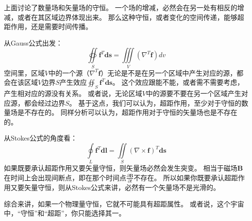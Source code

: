 上面讨论了数量场和矢量场的守恒。
一个场的增减，必然会在另一处有相反的增减，或者在其区域边界体现出来。
那么这种守恒，或者变化的空间传递，能够超距作用，还是需要时间传播。

从Gauss公式出发：
\[
\oiint\limits_S{\boldsymbol{f}^T\boldsymbol{ds}}=\iiint\limits_V{\left( \nabla ^T\boldsymbol{f} \right) dv}
\]
空间里，区域$V$中的一个源（$\nabla ^T\boldsymbol{f}$）无论是不是在另一个区域中产生对应的源，都会在该区域$V$边界$S$产生效应$\oiint_S{\boldsymbol{f}^T\boldsymbol{ds}}$。
这个效应跟能不能，或者需不需要考虑，产生相对应的源没有关系。
或者说，无论区域$V$中的源要不要在另一个区域产生对应源，都会经过边界$S$。
基于这点，我们可以认为，超距作用，至少对于守恒的数量场是不存在的。
同样分析可以认为，超距作用对于守恒的矢量场也是不存在的。

从Stokes公式的角度看：
\[
\oint\limits_L{\boldsymbol{f}^T\boldsymbol{dl}}=\iint\limits_S{\left( \nabla \times \boldsymbol{f} \right) ^T\boldsymbol{ds}}
\]
如果既要承认超距作用又要矢量守恒，则矢量场必然会发生突变。
相当于磁场$\boldsymbol{B}$在时间上会出现间断点，即在那个时间点$\frac{\partial \boldsymbol{B}}{\partial t}$不存在。
所以如果你既要承认超距作用又要矢量守恒，则从Stokes公式来讲，必然有一个矢量场不是光滑的。

综合来讲，如果一个物理量守恒，它就不可能具有超距属性。
或者说，这个宇宙中，“守恒”和“超距”，你只能选择其一。




